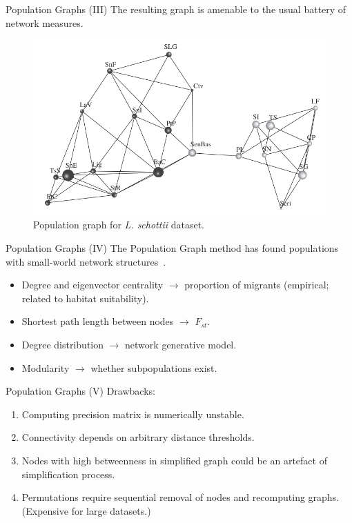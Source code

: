 \documentclass{beamer}
\begin{document}
\begin{frame}{Population Graphs (III)}
  The resulting graph is amenable to the usual battery of network measures.
  \begin{figure}
    \includegraphics[width=.9\linewidth,keepaspectratio]{../Figures/fig4.png}
    \caption{Population graph for \textit{L. schottii}
    dataset.}
  \end{figure}
\end{frame}

\begin{frame}{Population Graphs (IV)}
  The Population Graph method has found populations with small-world network
  structures~\cite{garroway_applications_2008}.
  \begin{itemize}
    \item Degree and eigenvector centrality $\rightarrow$ proportion of
      migrants (empirical; related to habitat suitability).
    \item Shortest path length between nodes $\rightarrow$ $F_{st}$.
    \item Degree distribution $\rightarrow$ network generative model.
    \item Modularity $\rightarrow$ whether subpopulations exist.
  \end{itemize}
\end{frame}

\begin{frame}{Population Graphs (V)}
  Drawbacks:
  \begin{enumerate}
    \item Computing precision matrix is numerically unstable.
    \item Connectivity depends on arbitrary distance thresholds.
    \item Nodes with high betweenness in simplified graph could be an
      artefact of simplification process.
    \item Permutations require sequential removal of nodes and recomputing
      graphs. (Expensive for large datasets.)
  \end{enumerate}
\end{frame}
\end{document}
